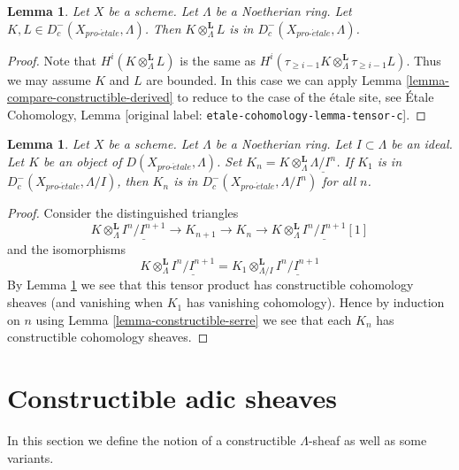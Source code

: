 \documentclass[10pt,a4paper]{article}
\theoremstyle{plain}
\newtheorem{lemma}[subsection]{Lemma}
\theoremstyle{definition}
\theoremstyle{remark}
\numberwithin{equation}{subsection}
\def\proetale{{pro\text{-}\acute{e}tale}}
\begin{document}
\begin{lemma}
\label{lemma-tensor-c}
Let $X$ be a scheme. Let $\Lambda$ be a Noetherian ring.
Let $K, L \in D_c^-(X_\proetale, \Lambda)$. Then
$K \otimes_\Lambda^\mathbf{L} L$ is in $D_c^-(X_\proetale, \Lambda)$.
\end{lemma}

\begin{proof}
Note that $H^i(K \otimes_\Lambda^\mathbf{L} L)$ is the same as
$H^i(\tau_{\geq i - 1}K \otimes_\Lambda^\mathbf{L} \tau_{\geq i - 1}L)$.
Thus we may assume $K$ and $L$ are bounded.
In this case we can apply Lemma \ref{lemma-compare-constructible-derived} to
reduce to the case of the \'etale site, see
\'Etale Cohomology, Lemma [original label: \nolinkurl{etale-cohomology-lemma-tensor-c}].
\end{proof}

\begin{lemma}
\label{lemma-compare-truncations-constructible}
Let $X$ be a scheme. Let $\Lambda$ be a Noetherian ring.
Let $I \subset \Lambda$ be an ideal.
Let $K$ be an object of $D(X_\proetale, \Lambda)$.
Set $K_n = K \otimes_\Lambda^\mathbf{L} \underline{\Lambda/I^n}$.
If $K_1$ is in $D^-_c(X_\proetale, \Lambda/I)$, then
$K_n$ is in $D^-_c(X_\proetale, \Lambda/I^n)$ for all $n$.
\end{lemma}

\begin{proof}
Consider the distinguished triangles
$$
K \otimes_\Lambda^\mathbf{L} \underline{I^n/I^{n + 1}} \to
K_{n + 1} \to
K_n \to
K \otimes_\Lambda^\mathbf{L} \underline{I^n/I^{n + 1}}[1]
$$
and the isomorphisms
$$
K \otimes_\Lambda^\mathbf{L} \underline{I^n/I^{n + 1}} =
K_1 \otimes_{\Lambda/I}^\mathbf{L} \underline{I^n/I^{n + 1}}
$$
By Lemma \ref{lemma-tensor-c} we see that this tensor product has
constructible cohomology sheaves (and vanishing when $K_1$ has
vanishing cohomology). Hence by induction on $n$ using
Lemma \ref{lemma-constructible-serre}
we see that each $K_n$ has constructible cohomology sheaves.
\end{proof}








\section{Constructible adic sheaves}
\label{section-adic}

\noindent
In this section we define the notion of a constructible
$\Lambda$-sheaf as well as some variants.
\end{document}
